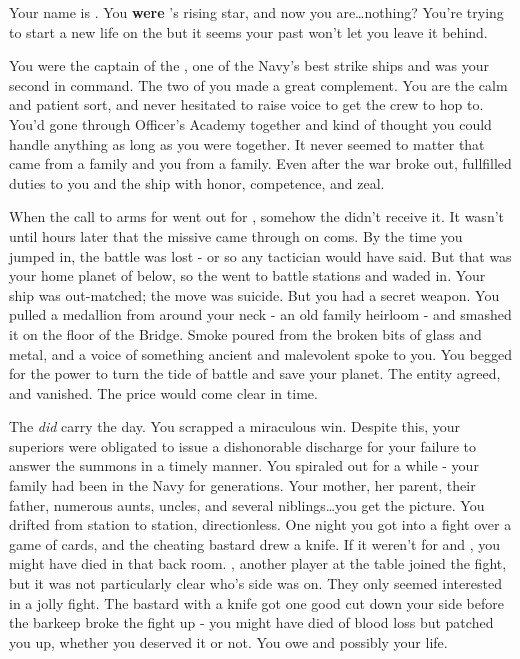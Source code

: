 \documentclass[char]{TMFHope}
\begin{document}
\name{\cCap{}}

Your name is \cCap{\full}. You {\bf were} \pTMN{}'s rising star, and now you are\ldots nothing? You're trying to start a new life on the \pNew{} but it seems your past won't let you leave it behind. 

You were the captain of the \pOld{}, one of the Navy's best strike ships and \cXO{\full} was your second in command. The two of you made a great complement. You are the calm and patient sort, and \cXO{} never hesitated to raise \cXO{\their} voice to get the crew to hop to. You'd gone through Officer's Academy together and kind of thought you could handle anything as long as you were together. It never seemed to matter that \cXO{} came from a \pEdge{} family and you from a \pPlan{} family. Even after the war broke out, \cXO{\they} fullfilled \cXO{\their} duties to you and the ship with honor, competence, and zeal. 

When the call to arms for went out for \pBattle{}, somehow the \pOld{} didn't receive it. It wasn't until hours later that the  missive came through on coms. By the time you jumped in, the battle was lost - or so any tactician would have said. But that was your home planet of \pHome{} below, so the \pOld{} went to battle stations and waded in. Your ship was out-matched; the move was suicide. But you had a secret weapon. You pulled a medallion from around your neck - an old family heirloom - and smashed it on the floor of the Bridge. Smoke poured from the broken bits of glass and metal, and a voice of something ancient and malevolent spoke to you. You begged for the power to turn the tide of battle and save your planet. The entity agreed, and vanished. The price would come clear in time.

The \pOld{} \emph{did} carry the day. You scrapped a miraculous win. Despite this, your superiors were obligated to issue a dishonorable discharge for your failure to answer the summons in a timely manner. You spiraled out for a while - your family had been in the Navy for generations. Your mother, her parent, their father, numerous aunts, uncles, and several niblings\ldots you get the picture. You drifted from station to station, directionless. One night you got into a fight over a game of cards, and the cheating bastard drew a knife. If it weren't for \cSci{} and \cMed{}, you might have died in that back room. \cSci{}, another player at the table joined the fight, but it was not particularly clear who's side \cSci{\they} was on. They only seemed interested in a jolly fight. The bastard with a knife got one good cut down your side before the barkeep broke the fight up - you might have died of blood loss but \cMed{} patched you up, whether you deserved it or not. You owe \cMed{} and possibly \cSci{} your life.
\end{document}
